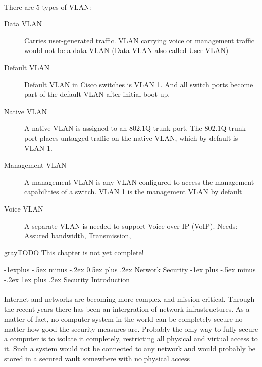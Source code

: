 \documentclass[10pt,landscape]{article}
\makeatletter
\renewcommand{\subsection}{\@startsection{subsection}{2}{0mm}%
                                {-1explus -.5ex minus -.2ex}%
                                {0.5ex plus .2ex}%
                                {\normalfont\normalsize\bfseries}}
\renewcommand{\subsubsection}{\@startsection{subsubsection}{3}{0mm}%
                                {-1ex plus -.5ex minus -.2ex}%
                                {1ex plus .2ex}%
                                {\normalfont\small\bfseries}}
\makeatother
\begin{document}
\begin{multicols}{3}
\paragraph{}
There are 5 types of VLAN:
\begin{description}
	\item[Data VLAN] Carries user-generated traffic. VLAN carrying voice or management traffic would not be a data VLAN (Data VLAN also called User VLAN)
	\item[Default VLAN] Default VLAN in Cisco switches is VLAN 1. And all switch ports become part of the default VLAN after initial boot up.
	\item[Native VLAN] A native VLAN is assigned to an 802.1Q trunk port. The 802.1Q trunk port places untagged traffic on the native VLAN, which by default is VLAN 1.
	\item[Management VLAN] A management VLAN is any VLAN configured to access the management capabilities of a switch. VLAN 1 is the management VLAN by default
	\item[Voice VLAN] A separate VLAN is needed to support Voice over IP (VoIP). Needs: Assured bandwidth, Transmission,
\end{description}

\begin{textbox}{gray}{TODO}
	This chapter is not yet complete!
\end{textbox}

\subsection{Network Security}
\subsubsection{Security Introduction}
\paragraph{}
Internet and networks are becoming more complex and mission critical. Through the recent years there has been an intergration of network infrastructures.
As a matter of fact, no computer system in the world can be completely secure no matter how good the security measures are. Probably the only way to fully secure a computer is to isolate it completely, restricting all physical and virtual access to it. Such a system would not be connected to any network and would probably be stored in a secured vault somewhere with no physical access

\end{multicols}
\end{document}
